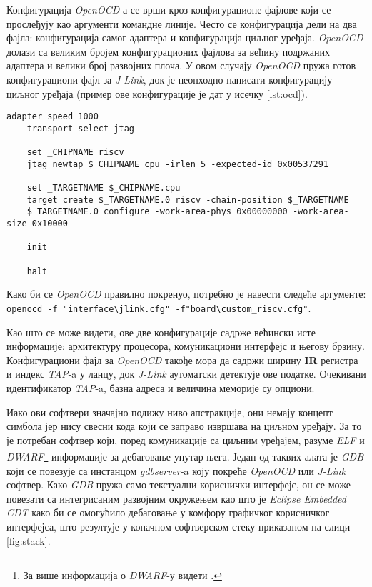 Конфигурација \textit{Open\acrshort{OCD}}-а се врши кроз конфигурационе фајлове који се прослеђују као аргументи командне линије. Често се конфигурација дели на два фајла: конфигурација самог адаптера и конфигурација циљног уређаја. \textit{Open\acrshort{OCD}} 
долази са великим бројем конфигурационих фајлова за већину подржаних адаптера и велики број развојних плоча. У овом случају \textit{Open\acrshort{OCD}} пружа готов конфигурациони фајл за \textit{J-Link}, док је неопходно написати конфигурацију циљног уређаја (пример ове конфигурације је дат у исечку \ref{lst:ocd}).

\begin{lstlisting}[language=none,caption=Конфигурациони фајл циљног уређаја за \textit{Open\acrshort{OCD}} (\textbf{board\textbackslash{}custom\_riscv.cfg}),label=lst:ocd]
	adapter speed 1000
	transport select jtag
	
	set _CHIPNAME riscv
	jtag newtap $_CHIPNAME cpu -irlen 5 -expected-id 0x00537291
	
	set _TARGETNAME $_CHIPNAME.cpu
	target create $_TARGETNAME.0 riscv -chain-position $_TARGETNAME
	$_TARGETNAME.0 configure -work-area-phys 0x00000000 -work-area-size 0x10000
	
	init
	
	halt
\end{lstlisting}

Како би се \textit{Open\acrshort{OCD}} правилно покренуо, потребно је навести следеће аргументе:\\ \lstinline[language=none,columns=fixed]{openocd -f "interface\jlink.cfg" -f"board\custom_riscv.cfg"}.

Као што се може видети, ове две конфигурације садрже већински исте информације: архитектуру процесора, комуникациони интерфејс и његову брзину. Конфигурациони фајл за \textit{Open\acrshort{OCD}} такође мора да садржи ширину \textbf{\acrshort{IR}} регистра и индекс \textit{\acrshort{TAP}}-a у ланцу, док \textit{J-Link} аутоматски детектује ове податке.
Очекивани идентификатор \textit{\acrshort{TAP}}-a, базна адреса и величина меморије су опциони.

Иако ови софтвери значајно подижу ниво апстракције, они немају концепт симбола јер нису свесни кода који се заправо извршава на циљном уређају. За то је потребан софтвер који, поред комуникације са циљним уређајем, разуме \textit{\acrfull{ELF}} и \textit{\acrshort{DWARF}}\footnote{За више информација о \textit{\acrshort{DWARF}}-у видети \cite{csned}.} информације за дебаговање унутар њега. Један од таквих алата је \textit{\acrshort{GDB}} који се повезује са инстанцом \textit{gdbserver}-a коју покреће \textit{Open\acrshort{OCD}} или \textit{J-Link} софтвер. Како \textit{\acrshort{GDB}} пружа само текстуални кориснички интерфејс, он се може повезати са интегрисаним развојним окружењем као што је \textit{Eclipse Embedded CDT} како би се омогућило дебаговање у комфору графичког корисничког интерфејса, што резултује у коначном софтверском стеку приказаном на слици \ref{fig:stack}.

